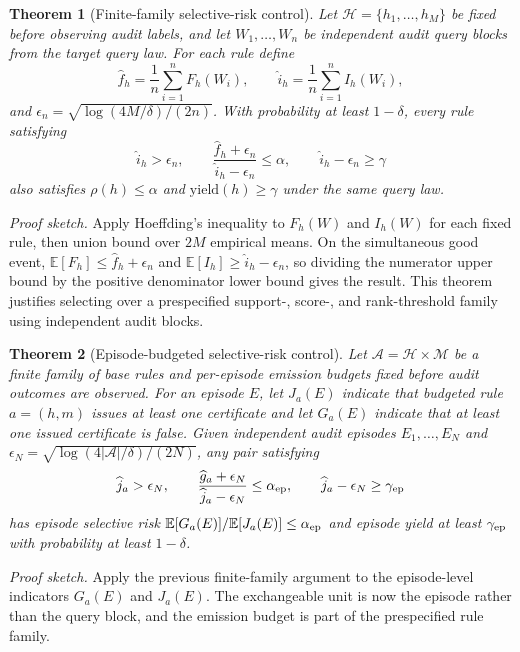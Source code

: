 \documentclass[letterpaper]{article}
\newtheorem{theorem}{Theorem}
\begin{document}
\begin{theorem}[Finite-family selective-risk control]
Let $\mathcal{H}=\{h_1,\ldots,h_M\}$ be fixed before observing audit labels, and
let $W_1,\ldots,W_n$ be independent audit query blocks from the target query
law. For each rule define
\[
\widehat f_h=\frac{1}{n}\sum_{i=1}^n F_h(W_i), \qquad
\widehat i_h=\frac{1}{n}\sum_{i=1}^n I_h(W_i),
\]
and $\epsilon_n=\sqrt{\log(4M/\delta)/(2n)}$. With probability at least
$1-\delta$, every rule satisfying
\[
\widehat i_h>\epsilon_n,\qquad
\frac{\widehat f_h+\epsilon_n}{\widehat i_h-\epsilon_n}\le\alpha,\qquad
\widehat i_h-\epsilon_n\ge\gamma
\]
also satisfies $\rho(h)\le\alpha$ and $\mathrm{yield}(h)\ge\gamma$ under the
same query law.
\end{theorem}

\noindent\textit{Proof sketch.}
Apply Hoeffding's inequality to $F_h(W)$ and $I_h(W)$ for each fixed rule, then
union bound over $2M$ empirical means. On the simultaneous good event,
$\mathbb{E}[F_h]\le \widehat f_h+\epsilon_n$ and
$\mathbb{E}[I_h]\ge \widehat i_h-\epsilon_n$, so dividing the numerator upper
bound by the positive denominator lower bound gives the result. This theorem
justifies selecting over a prespecified support-, score-, and rank-threshold
family using independent audit blocks.

\begin{theorem}[Episode-budgeted selective-risk control]
Let $\mathcal{A}=\mathcal{H}\times\mathcal{M}$ be a finite family of base
rules and per-episode emission budgets fixed before audit outcomes are
observed. For an episode $E$, let $J_a(E)$ indicate that budgeted rule
$a=(h,m)$ issues at least one certificate and let $G_a(E)$ indicate that at
least one issued certificate is false. Given independent audit episodes
$E_1,\ldots,E_N$ and
$\epsilon_N=\sqrt{\log(4|\mathcal{A}|/\delta)/(2N)}$, any pair satisfying
\[
\widehat j_a>\epsilon_N,\qquad
\frac{\widehat g_a+\epsilon_N}{\widehat j_a-\epsilon_N}\le\alpha_{\rm ep},
\qquad
\widehat j_a-\epsilon_N\ge\gamma_{\rm ep}
\]
has episode selective risk
$\mathbb{E}[G_a(E)]/\mathbb{E}[J_a(E)]\le\alpha_{\rm ep}$ and episode yield at
least $\gamma_{\rm ep}$ with probability at least $1-\delta$.
\end{theorem}

\noindent\textit{Proof sketch.}
Apply the previous finite-family argument to the episode-level indicators
$G_a(E)$ and $J_a(E)$. The exchangeable unit is now the episode rather than
the query block, and the emission budget is part of the prespecified rule
family.
\end{document}
